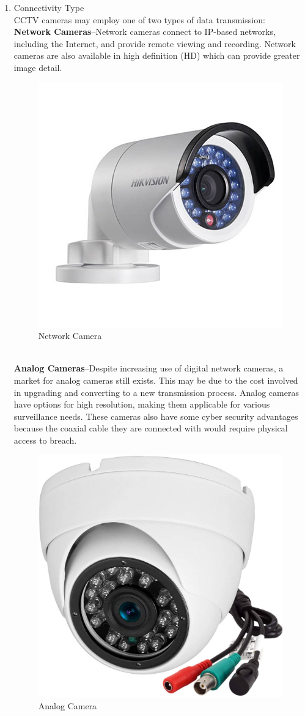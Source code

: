 \documentclass[12pt,fleqn]{book} %
\begin{document}
\begin{enumerate}
    \item Connectivity Type
    \\CCTV cameras may employ one of two types of data transmission:
    \\\textbf{Network Cameras}–Network cameras connect to IP-based networks, including the Internet, and provide remote viewing and recording. Network cameras are also available in high definition (HD) which can provide greater image detail.
     \begin{figure}[!h]
    \centering
    \includegraphics[width=0.5\linewidth]{c 4.png}
    \caption{Network Camera}
    \label{fig:c 4}
    \end{figure}
    \\\textbf{Analog Cameras}–Despite increasing use of digital network cameras, a market for analog cameras still exists. This may be due to the cost involved in upgrading and converting to a new transmission process. Analog cameras have options for high resolution, making them applicable for various surveillance needs. These cameras also have some cyber security advantages because the coaxial cable they are connected with would require physical access to breach.
     \begin{figure}[!h]
    \centering
    \includegraphics[width=0.5\linewidth]{c 5.png}
    \caption{Analog Camera}
    \label{fig:c 5}
    \end{figure}
    

\end{enumerate}
\end{document}
